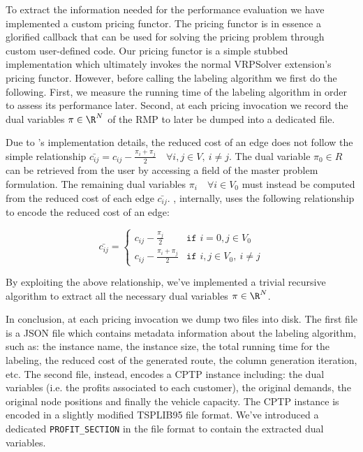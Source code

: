 To extract the information needed for the performance evaluation we have implemented a custom pricing functor.
The pricing functor is in essence a glorified callback that can be used
for solving the pricing problem through custom user-defined code.
Our pricing functor is a simple stubbed implementation which ultimately invokes
the normal VRPSolver extension's pricing functor.
However, before calling the labeling algorithm we first do the following.
First, we measure the running time of the labeling algorithm in order to assess its performance later.
Second, at each pricing invocation we record the dual variables $\pi \in \R^N$ of the RMP
to later be dumped into a dedicated file.

Due to \bapcod's implementation details, the reduced cost of an
edge does not follow the simple relationship $\bar{c_{ij}} = c_{ij} - \frac{\pi_i + \pi_j}{2} \quad \forall i, j \in V,\ i \ne j$.
The dual variable $\pi_0 \in R$ can be retrieved from the user by accessing a field
of the master problem formulation.
The remaining dual variables $\pi_i \quad \forall i \in V_0$ must instead be computed
from the reduced cost of each edge $\bar{c_{ij}}$.
\bapcod, internally, uses the following relationship to encode the reduced cost of an edge:

\begin{equation}
	\bar{c_{ij}} = \begin{cases}
		c_{ij} - \frac{\pi_{j}}{2}       & \texttt{if } i = 0, j \in V_0       \\
		c_{ij} - \frac{\pi_i + \pi_j}{2} & \texttt{if } i, j \in V_0,\ i \ne j
	\end{cases}
\end{equation}

By exploiting the above relationship, we've implemented a trivial recursive algorithm
to extract all the necessary dual variables $\pi \in \R^N$.

In conclusion, at each pricing invocation we dump two files into disk.
The first file is a JSON file which contains metadata information about
the labeling algorithm, such as: the instance name, the instance size,
the total running time for the labeling, the reduced cost of the generated route,
the column generation iteration, etc.
The second file, instead, encodes a CPTP instance including:
the dual variables (i.e. the profits associated to each customer),
the original demands, the original node positions and finally the vehicle capacity.
The CPTP instance is encoded in a slightly modified TSPLIB95 file format.
We've introduced a dedicated \texttt{PROFIT\_SECTION} in the file format
to contain the extracted dual variables.

